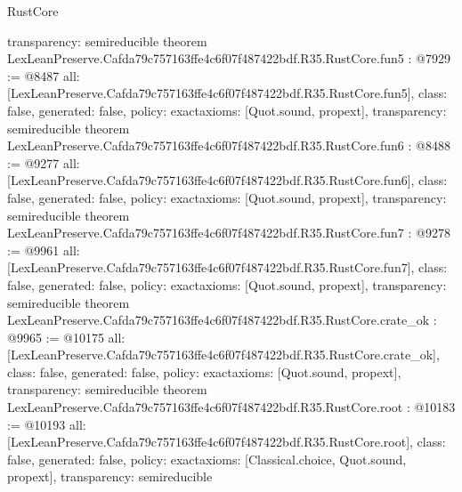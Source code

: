 \begin{lexlean}{RustCore}
\begin{coremodule}
{  transparency: semireducible
}
theorem LexLeanPreserve.Cafda79c757163ffe4c6f07f487422bdf.R35.RustCore.fun5 : @7929 := @8487 {
  all: [LexLeanPreserve.Cafda79c757163ffe4c6f07f487422bdf.R35.RustCore.fun5],
  class: false,
  generated: false,
  policy: exact{axioms: [Quot.sound, propext]},
  transparency: semireducible
}
theorem LexLeanPreserve.Cafda79c757163ffe4c6f07f487422bdf.R35.RustCore.fun6 : @8488 := @9277 {
  all: [LexLeanPreserve.Cafda79c757163ffe4c6f07f487422bdf.R35.RustCore.fun6],
  class: false,
  generated: false,
  policy: exact{axioms: [Quot.sound, propext]},
  transparency: semireducible
}
theorem LexLeanPreserve.Cafda79c757163ffe4c6f07f487422bdf.R35.RustCore.fun7 : @9278 := @9961 {
  all: [LexLeanPreserve.Cafda79c757163ffe4c6f07f487422bdf.R35.RustCore.fun7],
  class: false,
  generated: false,
  policy: exact{axioms: [Quot.sound, propext]},
  transparency: semireducible
}
theorem LexLeanPreserve.Cafda79c757163ffe4c6f07f487422bdf.R35.RustCore.crate_ok : @9965 := @10175 {
  all: [LexLeanPreserve.Cafda79c757163ffe4c6f07f487422bdf.R35.RustCore.crate_ok],
  class: false,
  generated: false,
  policy: exact{axioms: [Quot.sound, propext]},
  transparency: semireducible
}
theorem LexLeanPreserve.Cafda79c757163ffe4c6f07f487422bdf.R35.RustCore.root : @10183 := @10193 {
  all: [LexLeanPreserve.Cafda79c757163ffe4c6f07f487422bdf.R35.RustCore.root],
  class: false,
  generated: false,
  policy: exact{axioms: [Classical.choice, Quot.sound, propext]},
  transparency: semireducible
}


\end{coremodule}
\end{lexlean}
